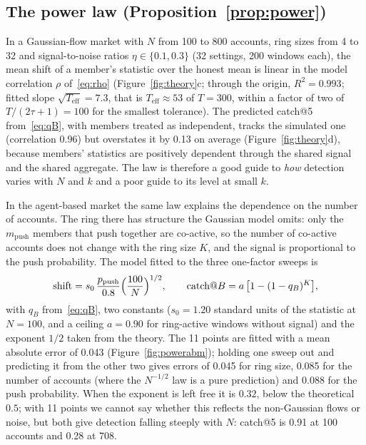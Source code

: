 \subsection{The power law (Proposition~\ref{prop:power})}\label{sec:powercheck}

In a Gaussian-flow market with $N$ from 100 to 800 accounts, ring sizes from 4 to 32 and signal-to-noise ratios $\eta\in\{0.1,0.3\}$ (32 settings, 200 windows each), the mean shift of a member's statistic over the honest mean is linear in the model correlation $\rho$ of~\eqref{eq:rho} (Figure~\ref{fig:theory}c; through the origin, $R^2=0.993$; fitted slope $\sqrt{T_{\mathrm{eff}}}=7.3$, that is $T_{\mathrm{eff}}\approx53$ of $T=300$, within a factor of two of $T/(2\tau+1)=100$ for the smallest tolerance). The predicted catch@5 from~\eqref{eq:qB}, with members treated as independent, tracks the simulated one (correlation 0.96) but overstates it by 0.13 on average (Figure~\ref{fig:theory}d), because members' statistics are positively dependent through the shared signal and the shared aggregate. The law is therefore a good guide to \emph{how} detection varies with $N$ and $k$ and a poor guide to its level at small $k$.

In the agent-based market the same law explains the dependence on the number of accounts. The ring there has structure the Gaussian model omits: only the $m_{\mathrm{push}}$ members that push together are co-active, so the number of co-active accounts does not change with the ring size $K$, and the signal is proportional to the push probability. The model fitted to the three one-factor sweeps is
\begin{equation}
\text{shift}=s_0\,\frac{p_{\mathrm{push}}}{0.8}\Bigl(\frac{100}{N}\Bigr)^{1/2},\qquad
\text{catch@}B=a\,\bigl[1-(1-q_B)^K\bigr],
\label{eq:fit}
\end{equation}
with $q_B$ from~\eqref{eq:qB}, two constants ($s_0=1.20$ standard units of the statistic at $N=100$, and a ceiling $a=0.90$ for ring-active windows without signal) and the exponent $1/2$ taken from the theory. The 11 points are fitted with a mean absolute error of 0.043 (Figure~\ref{fig:powerabm}); holding one sweep out and predicting it from the other two gives errors of 0.045 for ring size, 0.085 for the number of accounts (where the $N^{-1/2}$ law is a pure prediction) and 0.088 for the push probability. When the exponent is left free it is $0.32$, below the theoretical $0.5$; with 11 points we cannot say whether this reflects the non-Gaussian flows or noise, but both give detection falling steeply with $N$: catch@5 is 0.91 at 100 accounts and 0.28 at 708.

